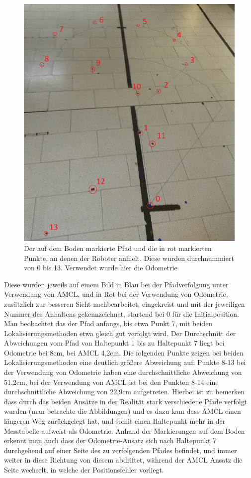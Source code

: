 \documentclass[11pt,a4paper]{article}
\begin{document}
  \begin{figure}[ht]
    \centering
    \includegraphics[scale = 0.9]{pfadODOM.png}
    \caption{Der auf dem Boden markierte Pfad und die in rot markierten Punkte, an denen der Roboter anhielt. Diese wurden durchnummiert von 0 bis 13.
     Verwendet wurde hier die Odometrie}
    \label{fig: pfadODOM}
    \end{figure}
Diese wurden jeweils auf einem Bild in Blau bei der Pfadverfolgung 
unter Verwendung von AMCL, und in Rot bei der Verwendung von Odometrie, zusätzlich zur besseren Sicht nachbearbeitet, eingekreist und mit der jeweiligen Nummer 
des Anhaltens gekennzeichnet, startend bei 0 für die Initialposition.
Man beobachtet das der Pfad anfangs, bis etwa Punkt 7, mit beiden Lokalisierungsmethoden etwa gleich gut verfolgt wird. Der Durchschnitt der Abweichungen vom Pfad 
von Haltepunkt 1 bis zu Haltepunkt 7 liegt bei Odometrie bei 8cm, bei AMCL 4,2cm. Die folgenden Punkte zeigen bei beiden Lokalisierungsmethoden eine deutlich 
größere Abweichung auf: Punkte 8-13 bei der Verwendung von Odometrie haben eine durchschnittliche Abweichung von 51,2cm, bei der Verwendung von AMCL ist bei den 
Punkten 8-14 eine durchschnittliche Abweichung von 22,9cm aufgetreten. Hierbei ist zu bemerken dass durch das beiden Ansätze in der Realität stark 
verschiedene Pfade verfolgt wurden (man betrachte die Abbildungen) und es dazu kam dass AMCL einen längeren Weg zurückgelegt hat, und somit einen Haltepunkt mehr in der Messtabelle 
aufweist als Odometrie.  Anhand der Markierungen auf dem Boden erkennt man auch dass der Odometrie-Ansatz sich nach Haltepunkt 7 durchgehend auf einer Seite des 
zu verfolgenden Pfades befindet, und immer weiter in diese Richtung von diesem abdriftet, während der AMCL Ansatz die Seite wechselt, in welche der Positionsfehler vorliegt.
\end{document}
